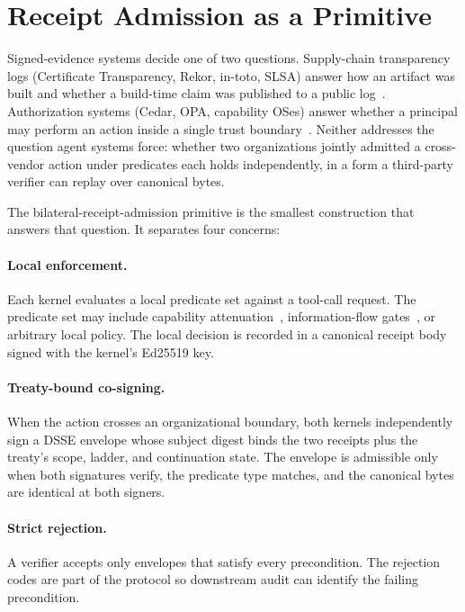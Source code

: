 \section{Receipt Admission as a Primitive}

Signed-evidence systems decide one of two questions. Supply-chain transparency logs (Certificate Transparency, Rekor, in-toto, SLSA) answer how an artifact was built and whether a build-time claim was published to a public log~\cite{rfc9162,sigstoreSecurity,torres2019intoto,slsa,dsse}. Authorization systems (Cedar, OPA, capability OSes) answer whether a principal may perform an action inside a single trust boundary~\cite{cedarOOPSLA2024,cedarFSE2024,miller2006composition,klein2009sel4}. Neither addresses the question agent systems force: whether two organizations jointly admitted a cross-vendor action under predicates each holds independently, in a form a third-party verifier can replay over canonical bytes.

The bilateral-receipt-admission primitive is the smallest construction that answers that question. It separates four concerns:

\paragraph{Local enforcement.} Each kernel evaluates a local predicate set against a tool-call request. The predicate set may include capability attenuation~\cite{miller2006composition}, information-flow gates~\cite{isolategptNDSS2025}, or arbitrary local policy. The local decision is recorded in a canonical receipt body signed with the kernel's Ed25519 key.

\paragraph{Treaty-bound co-signing.} When the action crosses an organizational boundary, both kernels independently sign a DSSE envelope whose subject digest binds the two receipts plus the treaty's scope, ladder, and continuation state. The envelope is admissible only when both signatures verify, the predicate type matches, and the canonical bytes are identical at both signers.

\paragraph{Strict rejection.} A verifier accepts only envelopes that satisfy every precondition. The rejection codes are part of the protocol so downstream audit can identify the failing precondition.

